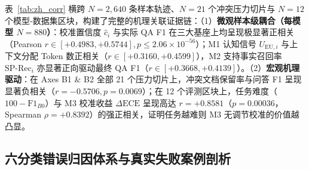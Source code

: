 \documentclass[11pt]{article}
\begin{document}
表~\ref{tab:zh_corr} 横跨 $N=2,640$ 条样本轨迹、$N=21$ 个冲突压力切片与 $N=12$ 个模型-数据集区块，构建了完整的机理关联证据链：（1）\textbf{微观样本级耦合（每模型 $N=880$）}：校准置信度 $\hat{c}_i$ 与实际 QA F1 在三大基座上均呈现极显著正相关（Pearson $r \in [+0.4983, +0.5744], p \le 2.06\times 10^{-56}$）；M1 认知信号 $U_{\text{EU}, i}$ 与上下文分配 Token 数正相关（$r \in [+0.3160, +0.4599]$），M2 支持事实召回率 $\text{SP-Rec}_i$ 亦显著正向驱动最终 QA F1（$r \in [+0.3668, +0.4139]$）。（2）\textbf{宏观机理驱动}：在 Axes B1 \& B2 全部 21 个压力切片上，冲突文档保留率与问答 F1 呈现显著负相关（$r=-0.5706, p=0.0069$）；在 12 个评测区块上，任务难度（$100-\text{F1}_{B0}$）与 M3 校准收益 $\Delta\text{ECE}$ 呈现高达 $r=+0.8581$（$p=0.00036$，Spearman $\rho=+0.8392$）的强正相关，证明任务越难则 M3 无调节校准的价值越凸显。

\subsection{六分类错误归因体系与真实失败案例剖析}
\end{document}
